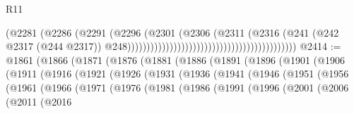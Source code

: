\begin{lexlean}{R11}
\begin{coremodule}
                                                                          (@2281
                                                                            (@2286
                                                                              (@2291
                                                                                (@2296
                                                                                  (@2301
                                                                                    (@2306
                                                                                      (@2311
                                                                                        (@2316
                                                                                          (@241
                                                                                            (@242
                                                                                              @2317
                                                                                              (@244
                                                                                                @2317))
                                                                                            @248))))))))))))))))))))))))))))))))))))))))))))
@2414 := @1861
    (@1866
      (@1871
        (@1876
          (@1881
            (@1886
              (@1891
                (@1896
                  (@1901
                    (@1906
                      (@1911
                        (@1916
                          (@1921
                            (@1926
                              (@1931
                                (@1936
                                  (@1941
                                    (@1946
                                      (@1951
                                        (@1956
                                          (@1961
                                            (@1966
                                              (@1971
                                                (@1976
                                                  (@1981
                                                    (@1986
                                                      (@1991
                                                        (@1996
                                                          (@2001
                                                            (@2006
                                                              (@2011
                                                                (@2016

\end{coremodule}
\end{lexlean}
